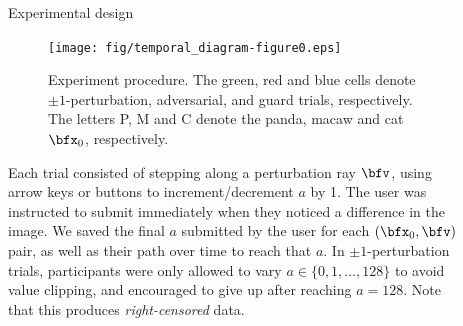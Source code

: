 \documentclass[final,notheorems]{beamer}
\newlength{\sepwidth}
\newlength{\colwidth}
\newcommand{\separatorcolumn}{\begin{column}{\sepwidth}\end{column}}
\begin{document}
\begin{frame}[t]
\begin{columns}[t]
\begin{column}{\colwidth}
\begin{block}{Experimental design}
    \begin{figure}
      \centering
      \texttt{[image: fig/temporal\_diagram-figure0.eps]}
      \caption{Experiment procedure.
      The green, red and blue cells denote $\pm 1$-perturbation, adversarial, and guard trials, respectively.
      The letters P, M and C denote the panda, macaw and cat $\bfx_0$, respectively.
      }
      \label{fig:temporal}
    \end{figure}

    Each trial consisted of stepping along a perturbation ray $\bfv$, using arrow keys or buttons to increment/decrement $a$ by 1.
    The user was instructed to submit immediately when they noticed a difference in the image.
    We saved the final $a$ submitted by the user for each $(\bfx_0, \bfv)$ pair, as well as their path over time to reach that $a$.
    In $\pm1$-perturbation trials, participants were only allowed to vary $a\in\{0,1,\ldots,128\}$ to avoid value clipping, and encouraged to give up after reaching $a=128$.
    Note that this produces \emph{right-censored} data.

  \end{block}
\end{column}

\separatorcolumn

\begin{column}{\colwidth}


\end{column}
\end{columns}
\end{frame}
\end{document}
